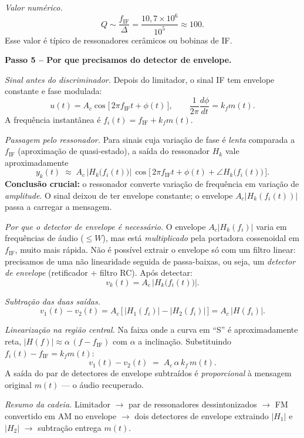 \documentclass[11pt,a4paper]{article}
\begin{document}
\begin{resolucao}
\emph{Valor numérico.}
\[
  Q \sim \frac{f_{\text{IF}}}{\Delta} = \frac{10{,}7\times 10^6}{10^5} \approx 100.
\]
Esse valor é típico de ressonadores cerâmicos ou bobinas de IF.

\textbf{Passo 5 -- Por que precisamos do detector de envelope.}

\emph{Sinal antes do discriminador.} Depois do limitador, o sinal IF tem envelope constante e fase modulada:
\[
  u(t) = A_c \cos\!\big[\,2\pi f_{\text{IF}} t + \phi(t)\,\big], \qquad
  \frac{1}{2\pi}\frac{d\phi}{dt} = k_f m(t).
\]
A frequência instantânea é $f_i(t) = f_{\text{IF}} + k_f m(t)$.

\emph{Passagem pelo ressonador.} Para sinais cuja variação de fase é \emph{lenta} comparada a $f_{\text{IF}}$ (aproximação de quasi-estado), a saída do ressonador $H_k$ vale aproximadamente
\[
  y_k(t) \;\approx\; A_c\,|H_k\!\big(f_i(t)\big)|\,\cos\!\Big[\,2\pi f_{\text{IF}} t + \phi(t) + \angle H_k\!\big(f_i(t)\big)\,\Big].
\]
\textbf{Conclusão crucial:} o ressonador converte variação de frequência em variação de \emph{amplitude}. O sinal deixou de ter envelope constante; o envelope $A_c|H_k(f_i(t))|$ passa a carregar a mensagem.

\emph{Por que o detector de envelope é necessário.} O envelope $A_c|H_k(f_i)|$ varia em frequências de áudio ($\le W$), mas está \emph{multiplicado} pela portadora cossenoidal em $f_{\text{IF}}$, muito mais rápida. Não é possível extrair o envelope só com um filtro linear: precisamos de uma não linearidade seguida de passa-baixas, ou seja, um \emph{detector de envelope} (retificador + filtro RC). Após detectar:
\[
  v_k(t) = A_c\,|H_k\!\big(f_i(t)\big)|.
\]

\emph{Subtração das duas saídas.}
\[
  v_1(t) - v_2(t) = A_c\,\big[\,|H_1(f_i)| - |H_2(f_i)|\,\big] = A_c\,|H(f_i)|.
\]

\emph{Linearização na região central.} Na faixa onde a curva em ``S'' é aproximadamente reta, $|H(f)| \approx \alpha\,(f - f_{\text{IF}})$ com $\alpha$ a inclinação. Substituindo $f_i(t) - f_{\text{IF}} = k_f m(t)$:
\[
  \boxed{\,v_1(t) - v_2(t) \;=\; A_c\,\alpha\,k_f\,m(t).\,}
\]
A saída do par de detectores de envelope subtraídos é \emph{proporcional} à mensagem original $m(t)$ --- o áudio recuperado.

\emph{Resumo da cadeia.} Limitador $\to$ par de ressonadores dessintonizados $\to$ FM convertido em AM no envelope $\to$ dois detectores de envelope extraindo $|H_1|$ e $|H_2|$ $\to$ subtração entrega $m(t)$.
\end{resolucao}
\end{document}
